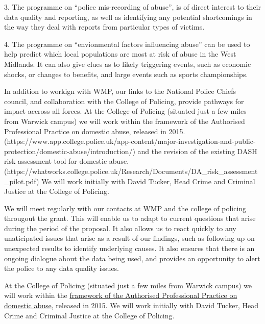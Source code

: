 \documentclass[11pt, a4paper]{article}
\begin{document}
3. The programme on ``police mis-recording of abuse'', is of direct interest to their data quality and reporting, as well as identifying any potential shortcomings in the way they deal with reports from particular types of victims. 

4. The programme on ``envionmental factors influencing abuse'' can be used to help predict which local populations are most at risk of abuse in the West Midlands. It can also give clues as to likely triggering events, such as economic shocks, or changes to benefits, and large events such as sports championships.

In addition to workign with WMP, our links to the National Police Chiefs council, and collaboration with the College of Policing, provide pathways for impact accross all forces. At the College of Policing (situated just a few miles from Warwick campus) we will work within the framework of the Authorised Professional Practice on domestic abuse, released in 2015. (https://www.app.college.police.uk/app-content/major-investigation-and-public-protection/domestic-abuse/introduction/) and the revision of the existing DASH risk assessment tool for domestic abuse. (https://whatworks.college.police.uk/Research/Documents/DA_risk_assessment_pilot.pdf) We will work initially with David Tucker, Head Crime and Criminal Justice at the College of Policing.

We will meet regularly with our contacts at WMP and the college of policing througout the grant. This will enable us to adapt to current questions that arise during the period of the proposal. It also allows us to react quickly to any unaticipated issues that arise as a result of our findings, such as following up on unexpected results to identify underlying causes. It also ensures that there is an ongoing dialogue about the data being used, and provides an opportunity to alert the police to any data quality issues.

At the College of Policing (situated just a few miles from Warwick campus) we will work within the \href{https://www.app.college.police.uk/app-content/major-investigation-and-public-protection/domestic-abuse/introduction/) and the revision of the existing DASH risk assessment tool for domestic abuse. (https://whatworks.college.police.uk/Research/Documents/DA_risk_assessment_pilot.pdf}{framework of the Authorised Professional Practice on domestic abuse}, released in 2015.  
We will work initially with David Tucker, Head Crime and Criminal Justice at the College of Policing.
\end{document}
